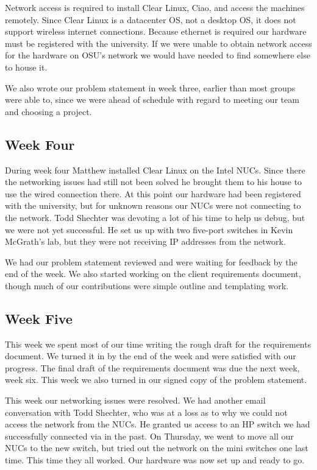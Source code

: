 \documentclass[10pt,onecolumn,journal,draftclsnofoot]{IEEEtran}
\begin{document}
Network access is required to install Clear Linux, Ciao, and access the machines
remotely. Since Clear Linux is a datacenter OS, not a desktop OS, it does not
support wireless internet connections. Because ethernet is required our hardware
must be registered with the university. If we were unable to obtain network
access for the hardware on OSU's network we would have needed to find somewhere
else to house it.

We also wrote our problem statement in week three, earlier than most groups were
able to, since we were ahead of schedule with regard to meeting our team and
choosing a project.

\subsection{Week Four}

During week four Matthew installed Clear Linux on the Intel NUCs. Since there
the networking issues had still not been solved he brought them to his house to
use the wired connection there. At this point our hardware had been registered
with the university, but for unknown reasons our NUCs were not connecting to the
network. Todd Shechter was devoting a lot of his time to help us debug, but we
were not yet successful. He set us up with two five-port switches in Kevin
McGrath's lab, but they were not receiving IP addresses from the network.

We had our problem statement reviewed and were waiting for feedback by the end
of the week. We also started working on the client requirements document, though
much of our contributions were simple outline and templating work.

\subsection{Week Five}

This week we spent most of our time writing the rough draft for the requirements
document. We turned it in by the end of the week and were satisfied with our
progress. The final draft of the requirements document was due the next week,
week six. This week we also turned in our signed copy of the problem statement.

This week our networking issues were resolved. We had another email conversation
with Todd Shechter, who was at a loss as to why we could not access the network
from the NUCs. He granted us access to an HP switch we had successfully
connected via in the past. On Thursday, we went to move all our NUCs to the new
switch, but tried out the network on the mini switches one last time. This time
they all worked. Our hardware was now set up and ready to go.
\end{document}
